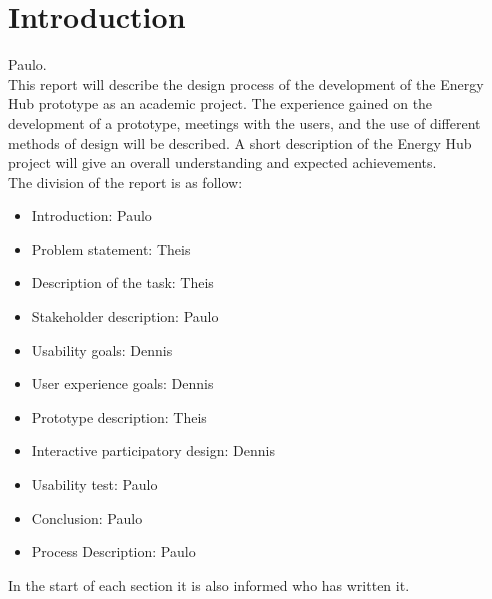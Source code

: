 \section{Introduction}Paulo.\\
This report will describe the design process of the development of the Energy Hub prototype as an academic project. The experience gained on the development of a prototype, meetings with the users, and the use of different methods of design will be described. A short description of the Energy Hub project will give an overall understanding and expected achievements.
\\ The division of the report is as follow: 
\begin{itemize}
	\item Introduction: Paulo
	\item Problem statement: Theis
	\item Description of the task: Theis
	\item Stakeholder description: Paulo
	\item Usability goals: Dennis
	\item User experience goals: Dennis
	\item Prototype description: Theis
	\item Interactive participatory design: Dennis
	\item Usability test: Paulo
	\item Conclusion: Paulo
	\item Process Description: Paulo
\end{itemize}
In the start of each section it is also informed who has written it.